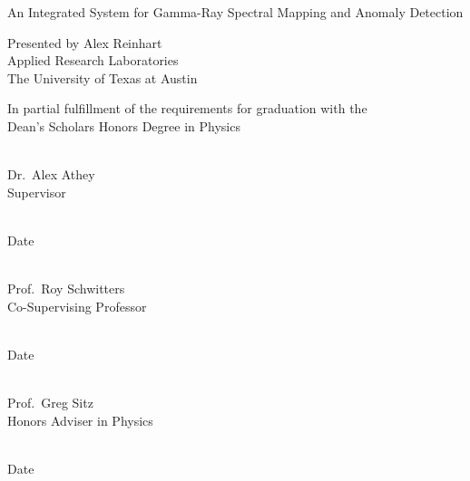 \documentclass[letterpaper,11pt]{memoir}
\newcommand{\sigline}{\noindent
\makebox[2.5in]{\hrulefill}\\}
\newcommand{\dateline}{\noindent
\makebox[1.5in]{\hrulefill}\\}
\begin{document}

\begin{titlingpage}
\begin{center}
\begin{Spacing}{2}
{\LARGE
  An Integrated System for Gamma-Ray Spectral Mapping and Anomaly Detection
}
\end{Spacing}
\end{center}

\begin{center}
  Presented by Alex Reinhart\\
  Applied Research Laboratories\\
  The University of Texas at Austin
\end{center}

\begin{center}
In partial fulfillment of the requirements for graduation with the\\
Dean’s Scholars Honors Degree in Physics
\end{center}

\vskip 1in

\begin{minipage}[t]{0.5\textwidth}
\sigline 
Dr.~Alex Athey\\
Supervisor
\end{minipage}\hskip 1in
\begin{minipage}[t]{0.4\textwidth}
\dateline
Date
\end{minipage}

\vskip 0.85in

\begin{minipage}[t]{0.5\textwidth}
\sigline
Prof.~Roy Schwitters\\
Co-Supervising Professor
\end{minipage}\hskip 1in
\begin{minipage}[t]{0.4\textwidth}
\dateline
Date
\end{minipage}

\vskip 0.85in

\begin{minipage}[t]{0.5\textwidth}
\sigline
Prof.~Greg Sitz\\
Honors Adviser in Physics
\end{minipage}\hskip 1in
\begin{minipage}[t]{0.4\textwidth}
\dateline
Date
\end{minipage}
\end{titlingpage}

\cleardoublepage
\end{document}
